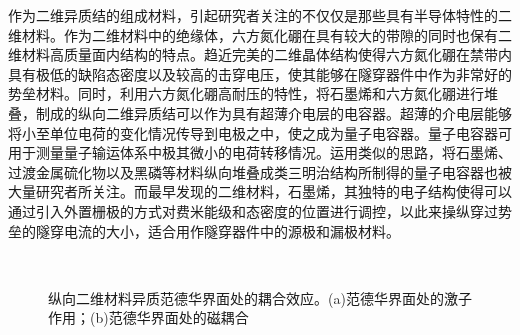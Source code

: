    作为二维异质结的组成材料，引起研究者关注的不仅仅是那些具有半导体特性的二维材料。作为二维材料中的绝缘体，六方氮化硼在具有较大的带隙的同时也保有二维材料高质量面内结构的特点。趋近完美的二维晶体结构使得六方氮化硼在禁带内具有极低的缺陷态密度以及较高的击穿电压，使其能够在隧穿器件中作为非常好的势垒材料。同时，利用六方氮化硼高耐压的特性，将石墨烯和六方氮化硼进行堆叠，制成的纵向二维异质结可以作为具有超薄介电层的电容器。超薄的介电层能够将小至单位电荷的变化情况传导到电极之中，使之成为量子电容器。量子电容器可用于测量量子输运体系中极其微小的电荷转移情况。运用类似的思路，将石墨烯、过渡金属硫化物以及黑磷等材料纵向堆叠成类三明治结构所制得的量子电容器也被大量研究者所关注。而最早发现的二维材料，石墨烯，其独特的电子结构使得可以通过引入外置栅极的方式对费米能级和态密度的位置进行调控，以此来操纵穿过势垒的隧穿电流的大小，适合用作隧穿器件中的源极和漏极材料。

    \begin{figure}[htb]
        \\
        \caption{纵向二维材料异质范德华界面处的耦合效应。(a)范德华界面处的激子作用；(b)范德华界面处的磁耦合}
        \label{}
    \end{figure}

